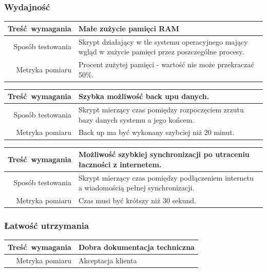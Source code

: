 \documentclass[paper=a4, fontsize=11pt]{scrartcl} %
\begin{document}
\subsubsection{Wydajność}

\begin{tabularx}{\textwidth}{|r|X|}
  \hline
Treść wymagania & Małe zużycie pamięci RAM \\ 
  \hline
Sposób testowania & Skrypt działający w tle systemu operacyjnego mający wgląd w zużycie pamięci przez poszczególne procesy. \\ 
  \hline
Metryka pomiaru & Procent zużytej pamięci - wartość nie może przekraczać 50\%. \\ 
  \hline
\end{tabularx}

\vspace{10 mm}

\begin{tabularx}{\textwidth}{|r|X|}
  \hline
Treść wymagania & Szybka możliwość back upu danych. \\ 
  \hline
Sposób testowania & Skrypt mierzący czas pomiędzy rozpoczęciem zrzutu bazy danych systemu a jego końcem. \\ 
  \hline
Metryka pomiaru & Back up ma być wykonany szybciej niż 20 minut. \\ 
  \hline
\end{tabularx}

\vspace{10 mm}

\begin{tabularx}{\textwidth}{|r|X|}
  \hline
Treść wymagania & Możliwość szybkiej synchronizacji po utraceniu łaczności z internetem. \\ 
  \hline
Sposób testowania & Skrypt mierzący czas pomiędzy podłączeniem internetu a wiadomością pełnej synchronizacji. \\ 
  \hline
Metryka pomiaru & Czas musi być krótszy niż 30 sekund. \\ 
  \hline
\end{tabularx}

\subsubsection{Łatwość utrzymania}

\begin{tabularx}{\textwidth}{|r|X|}
  \hline
Treść wymagania & Dobra dokumentacja techniczna\\ 
  \hline
Metryka pomiaru & Akceptacja klienta\\ 
  \hline
\end{tabularx}
\end{document}
